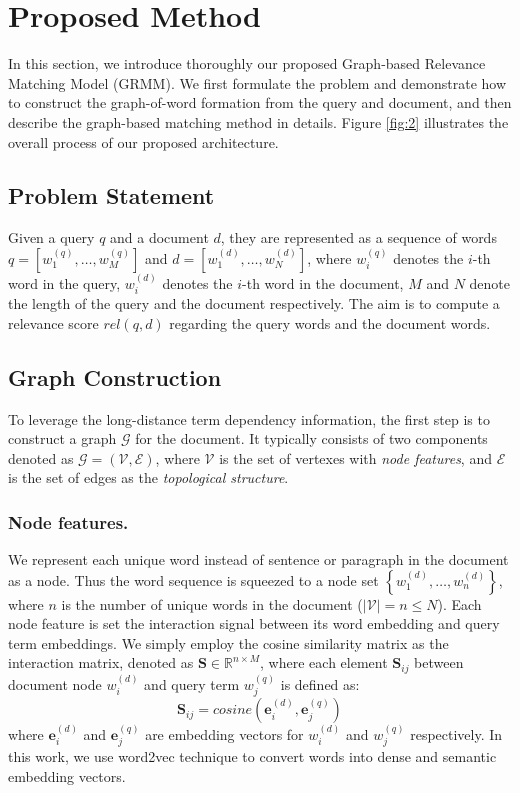 \section{Proposed Method}

In this section, we introduce thoroughly our proposed Graph-based Relevance Matching Model (GRMM). We first formulate the problem and demonstrate how to construct the graph-of-word formation from the query and document, and then describe the graph-based matching method in details. Figure \ref{fig:2} illustrates the overall process of our proposed architecture.

\subsection{Problem Statement}
Given a query $q$ and a document $d$, they are represented as a sequence of  words 
$q=\left[w_{1}^{(q)}, \ldots, w_{M}^{(q)}\right]$  and $d=\left[w_{1}^{(d)}, \ldots, w_{N}^{(d)}\right]$, where $w_{i}^{(q)}$ denotes the $i$-th word in the query, $w_{i}^{(d)}$ denotes the $i$-th word in the document, $M$ and $N$ denote the length of the query and the document respectively.
The aim is to compute a relevance score $rel(q,d)$ regarding the query words and the document words.


\subsection{Graph Construction}
\label{sec:graphconstruct}
To leverage the long-distance term dependency information, the first step is to construct a graph $\mathcal{G}$ for the document. It typically consists of two components denoted as $\mathcal{G}=(\mathcal{V}, \mathcal{E})$, 
where $\mathcal{V}$ is the set of vertexes with \emph{node features}, and $\mathcal{E}$ is the set of edges as the \emph{topological structure}.

\subsubsection{Node features.}
We represent each unique word instead of sentence or paragraph in the document as a node. Thus the word sequence is squeezed to a node set $\left\{w_{1}^{(d)}, \ldots, w_{n}^{(d)}\right\}$, where $n$ is the number of unique words in the document ($|\mathcal{V}| = n  \leq N$). Each node feature is set the interaction signal between its word embedding and query term embeddings. We simply employ the cosine similarity matrix as the interaction matrix, denoted as $\mathbf{S} \in \mathbb{R}^{n \times M}$, where each element $\mathbf{S}_{ij}$ between document node $w^{(d)}_i$ and query term $w^{(q)}_j$ is defined as:
\begin{equation}\mathbf{S}_{i j}=cosine\left(\mathbf{e}_i^{(d)}, \mathbf{e}_j^{(q)}\right)
\end{equation}
where $\mathbf{e}_{i}^{(d)}$ and $\mathbf{e}_{j}^{(q)} $ are embedding vectors for $w_{i}^{(d)}$ and $w_{j}^{(q)}$ respectively. In this work, we use word2vec \cite{mikolov2013distributed} technique to convert words into dense and semantic embedding vectors.

